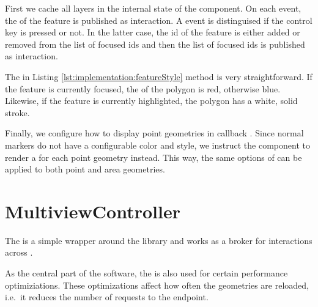 

First we cache all layers in the internal state of the  component.
On each  event, the  of the feature is published as  interaction.
A  event is distinguised if the control key is pressed or not.
In the latter case, the id of the feature is either added or removed from the list of focused ids and then the list of focused ids is published as  interaction.



The  in Listing \ref{lst:implementation:featureStyle} method is very straightforward.
If the feature is currently focused, the  of the polygon is red, otherwise blue.
Likewise, if the feature is currently highlighted, the polygon has a white, solid stroke.



Finally, we configure how to display point geometries in callback .
Since normal markers do not have a configurable color and style, we instruct the  component to render a  for each point geometry instead.
This way, the same options of  can be applied to both point and area geometries.

\section{MultiviewController}

The  is a simple wrapper around the library  and works as a broker for interactions across \cmvs{}.


As the central part of the software, the  is also used for certain performance optimiziations.
These optimizations affect how often the geometries are reloaded, i.e.\ it reduces the number of requests to the  endpoint.


